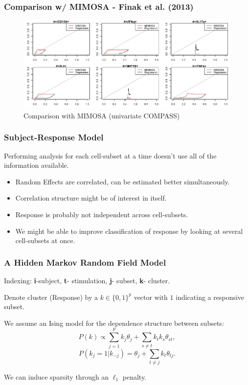 \documentclass{beamer}
\theoremstyle{definition}
\begin{document}

\begin{frame}
\frametitle{Comparison w/ MIMOSA - Finak et al. (2013) }
\begin{figure}[]
\includegraphics[width=11 cm]{figures/mimosaComparisonFDR} 
\caption{Comparison with MIMOSA (univariate COMPASS)}
\end{figure}
\end{frame}


\begin{frame}
\frametitle{Subject-Response Model}
Performing analysis for each cell-subset at a time doesn't use all of the information available.
\pause
\vspace{0.3 cm} 
\begin{itemize}
\item Random Effects are correlated, can be estimated better simultaneously.
\vspace{0.3 cm}
\item Correlation structure might be of interest in itself. 
\pause
\vspace{0.3 cm}
\item Response is probably not independent across cell-subsets.
\vspace{0.3 cm}
\item We might be able to improve classification of response by looking at several cell-subsets at once.  
\end{itemize}
\end{frame}


\begin{frame}
\frametitle{A Hidden Markov Random Field Model}
\begin{framed}
Indexing: \textbf{i}-subject, \textbf{t}- stimulation, \textbf{j}- subset, \textbf{k}- cluster.
\end{framed}

Denote cluster (Response) by a $k \in \{0,1\}^{p}$ vector with $1$ indicating a responsive subset.
\pause
\vspace{0.3 cm}

We assume an Ising model for the dependence structure between subsets:
$$
P(k) \propto \sum_{j=1}^{p} k_{j} \theta_j + \sum_{s\neq t} k_{t} k_{s} \theta_{st},
$$$$
P(k_{j} = 1| k_{-j}) = \theta_{j} + \sum_{t\neq j } k_{t} \theta_{tj}.
$$

\pause
\vspace{0.3 cm}
We can induce sparsity through an $\ell_1$ penalty.

\end{frame}
\end{document}
